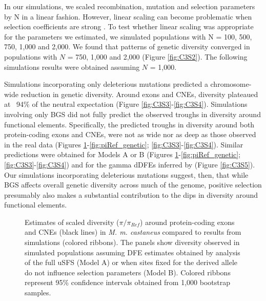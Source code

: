 	In our simulations, we scaled recombination, mutation and selection parameters by N in a linear fashion. However, linear scaling can become problematic when selection coefficients are strong \citep{RN198}. To test whether linear scaling was appropriate for the parameters we estimated, we simulated populations with N = 100, 500, 750, 1,000 and 2,000. We found that patterns of genetic diversity converged in populations with $N$ = 750, 1,000 and 2,000 (Figure \ref{fig:C3S2}). The following simulations results were obtained assuming $N$ = 1,000. 


	Simulations incorporating only deleterious mutations predicted a chromosome-wide reduction in genetic diversity. Around exons and CNEs, diversity plateaued at ~94\% of the neutral expectation (Figure \ref{fig:C3S3}-\ref{fig:C3S4}). Simulations involving only BGS did not fully predict the observed troughs in diversity around functional elements. Specifically, the predicted troughs in diversity around both protein-coding exons and CNEs, were not as wide nor as deep as those observed in the real data (Figures \ref{fig:piRef_physical}-\ref{fig:piRef_genetic}; \ref{fig:C3S3}-\ref{fig:C3S4}). Similar predictions were obtained for Models A or B (Figures \ref{fig:piRef_physical}-\ref{fig:piRef_genetic}; \ref{fig:C3S3}-\ref{fig:C3S4}) and for the gamma dDFEs inferred by \cite{RN122} (Figure \ref{fig:C3S5}). Our simulations incorporating deleterious mutations suggest, then, that while BGS affects overall genetic diversity across much of the genome, positive selection presumably also makes a substantial contribution to the dips in diversity around functional elements.
	
 \begin{figure}[H]
   \centering      
   \noindent{}
 \caption[Reductions in diversity caused by background selection and selective sweeps in simulated data - physical distance]{Estimates of scaled diversity ($\pi / \pi_{Ref}$) around protein-coding exons and CNEs (black lines) in \textit{M. m. castaneus} compared to results from simulations (colored ribbons). The panels show diversity observed in simulated populations assuming DFE estimates obtained by analysis of the full uSFS (Model A) or when sites fixed for the derived allele do not influence selection parameters (Model B). Colored ribbons represent 95\% confidence intervals obtained from 1,000 bootstrap samples.}
 \label{fig:piRef_physical}
\end{figure}

